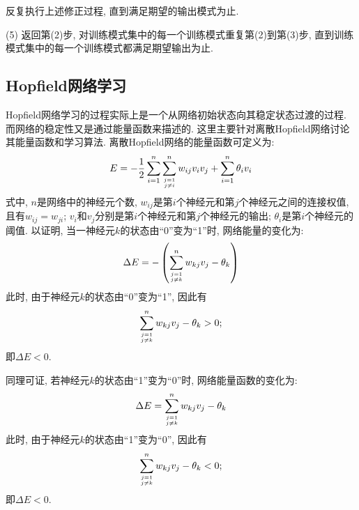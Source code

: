     反复执行上述修正过程, 直到满足期望的输出模式为止.

(5) 返回第(2)步, 对训练模式集中的每一个训练模式重复第(2)到第(3)步, 直到训练模式集中的每一个训练模式都满足期望输出为止.
\subsection{Hopfield网络学习}
Hopfield网络学习的过程实际上是一个从网络初始状态向其稳定状态过渡的过程. 而网络的稳定性又是通过能量函数来描述的. 这里主要针对离散Hopfield网络讨论其能量函数和学习算法.
离散Hopfield网络的能量函数可定义为:
\begin{align}
  E=-\frac{1}{2} \sum_{i=1}^{n} \sum_{j=1 \atop j \neq i}^{n} w_{i j} v_{i} v_{j}+\sum_{i=1}^{n} \theta_{i} v_{i}
\end{align}
式中, $n$是网络中的神经元个数, $w_{ij}$是第$i$个神经元和第$j$个神经元之间的连接权值, 且有$w_{ij}=w_{ji}$;  $v_i$和$v_j$分别是第$i$个神经元和第$j$个神经元的输出; $\theta_i$是第$i$个神经元的阈值.
以证明, 当一神经元$k$的状态由“0”变为“1”时, 网络能量的变化为:
\begin{align}
  \Delta E=-\left(\sum_{j=1 \atop j \neq k}^{n} w_{k j} v_{j}-\theta_{k}\right)
\end{align}
此时, 由于神经元$k$的状态由“0”变为“1”, 因此有
\begin{align}
  \sum_{j=1 \atop j \neq k}^{n} w_{k j} v_{j}-\theta_{k}>0;
\end{align}
即$\Delta E<0$.

同理可证, 若神经元$k$的状态由“1”变为“0”时, 网络能量函数的变化为:
\begin{align}
  \Delta E=\sum_{j=1 \atop j \neq k}^{n} w_{k j} v_{j}-\theta_{k}
\end{align}
此时, 由于神经元$k$的状态由“1”变为“0”, 因此有
\begin{align}
  \sum_{j=1 \atop j \neq k}^{n} w_{k j} v_{j}-\theta_{k}<0;
\end{align}
即$\Delta E<0$.

